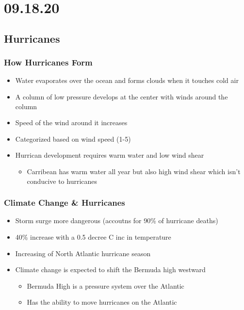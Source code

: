 \documentclass[11pt]{article}
\begin{document}
\section{09.18.20}
\label{sec:orga8c17b0}
\subsection{Hurricanes}
\label{sec:orgd180e9e}
\subsubsection{How Hurricanes Form}
\label{sec:org8d281f4}
\begin{itemize}
\item Water evaporates over the ocean and forms clouds when it touches cold air
\item A column of low pressure develops at the center with winds around the column
\item Speed of the wind around it increases
\end{itemize}
\begin{itemize}
\item Categorized based on wind speed (1-5)
\item Hurrican development requires warm water and low wind shear
\begin{itemize}
\item Carribean has warm water all year but also high wind shear which isn't conducive to hurricanes
\end{itemize}
\end{itemize}
\subsubsection{Climate Change \& Hurricanes}
\label{sec:orga23d8ee}
\begin{itemize}
\item Storm surge more dangerous (accoutns for 90\% of hurricane deaths)
\item 40\% increase with a 0.5 decree C inc in temperature
\item Increasing of North Atlantic hurricane season
\item Climate change is expected to shift the Bermuda high westward
\begin{itemize}
\item Bermuda High is a pressure system over the Atlantic
\item Has the ability to move hurricanes on the Atlantic
\end{itemize}
\end{itemize}
\end{document}
